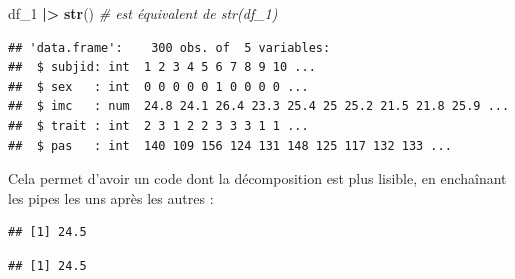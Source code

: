 \documentclass[
]{book}
\newenvironment{Shaded}{\begin{snugshade}}{\end{snugshade}}
\newcommand{\AttributeTok}[1]{\textcolor[rgb]{0.13,0.29,0.53}{#1}}
\newcommand{\CommentTok}[1]{\textcolor[rgb]{0.56,0.35,0.01}{\textit{#1}}}
\newcommand{\ConstantTok}[1]{\textcolor[rgb]{0.56,0.35,0.01}{#1}}
\newcommand{\DecValTok}[1]{\textcolor[rgb]{0.00,0.00,0.81}{#1}}
\newcommand{\FunctionTok}[1]{\textcolor[rgb]{0.13,0.29,0.53}{\textbf{#1}}}
\newcommand{\NormalTok}[1]{#1}
\newcommand{\SpecialCharTok}[1]{\textcolor[rgb]{0.81,0.36,0.00}{\textbf{#1}}}
\begin{document}
\begin{Shaded}
\begin{Highlighting}[]
\NormalTok{df\_1 }\SpecialCharTok{|\textgreater{}} \FunctionTok{str}\NormalTok{() }\CommentTok{\# est équivalent de str(df\_1)}
\end{Highlighting}
\end{Shaded}

\begin{verbatim}
## 'data.frame':    300 obs. of  5 variables:
##  $ subjid: int  1 2 3 4 5 6 7 8 9 10 ...
##  $ sex   : int  0 0 0 0 0 1 0 0 0 0 ...
##  $ imc   : num  24.8 24.1 26.4 23.3 25.4 25 25.2 21.5 21.8 25.9 ...
##  $ trait : int  2 3 1 2 2 3 3 3 1 1 ...
##  $ pas   : int  140 109 156 124 131 148 125 117 132 133 ...
\end{verbatim}

Cela permet d'avoir un code dont la décomposition est plus lisible, en enchaînant les pipes les uns après les autres :

\begin{Shaded}
\end{Shaded}

\begin{verbatim}
## [1] 24.5
\end{verbatim}

\begin{Shaded}
\end{Shaded}

\begin{verbatim}
## [1] 24.5
\end{verbatim}

\begin{Shaded}
\end{Shaded}
\end{document}
